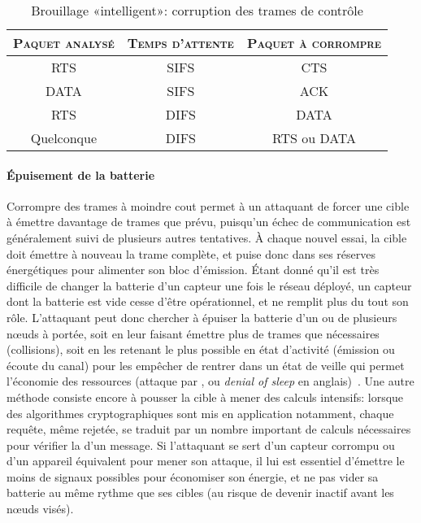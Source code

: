 
\begin{table}[!ht]
    \caption{Brouillage «intelligent»: corruption des trames de contrôle}\label{ea:tab:smartjam}
    \centering
    \medskip
    \begin{tabular}{c c c}
        \toprule
        \textsc{Paquet analysé} & \textsc{Temps d'attente} & \textsc{Paquet à corrompre}\\
        \midrule
        RTS & SIFS & CTS\\
        DATA & SIFS & ACK\\
        RTS & DIFS & DATA\\
        Quelconque & DIFS & RTS ou DATA\\
        \bottomrule
    \end{tabular}
\end{table}

        \paragraph{Épuisement de la batterie}
Corrompre des trames à moindre cout permet à un attaquant de forcer une cible à émettre davantage de trames que prévu, puisqu'un échec de communication est généralement suivi de plusieurs autres tentatives.
À chaque nouvel essai, la cible doit émettre à nouveau la trame complète, et puise donc dans ses réserves énergétiques pour alimenter son bloc d'émission.
Étant donné qu'il est très difficile de changer la batterie d'un capteur une fois le réseau déployé, un capteur dont la batterie est vide cesse d'être opérationnel, et ne remplit plus du tout son rôle.
L'attaquant peut donc chercher à épuiser la batterie d'un ou de plusieurs nœuds à portée, soit en leur faisant émettre plus de trames que nécessaires (collisions), soit en les retenant le plus possible en état d'activité (émission ou écoute du canal) pour les empêcher de rentrer dans un état de veille qui permet l'économie des ressources (attaque par , ou \textit{denial of sleep} en anglais)~\cite{MS14}.
Une autre méthode consiste encore à pousser la cible à mener des calculs intensifs: lorsque des algorithmes cryptographiques sont mis en application notamment, chaque requête, même rejetée, se traduit par un nombre important de calculs nécessaires pour vérifier la  d'un message.
Si l'attaquant se sert d'un capteur corrompu ou d'un appareil équivalent pour mener son attaque, il lui est essentiel d'émettre le moins de signaux possibles pour économiser son énergie, et ne pas vider sa batterie au même rythme que ses cibles (au risque de devenir inactif avant les nœuds visés).

